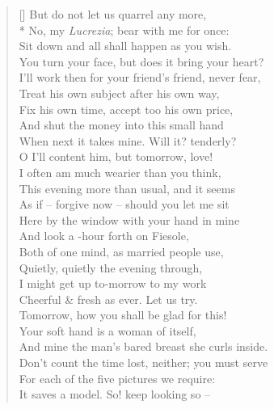 \documentclass[MAIN]{subfiles}
\begin{document}
\settowidth{\versewidth}{But do not let us quarrel any more,}
\begin{verse}[\versewidth]
But do not let us quarrel any more,\\*
No, my \emph{Lucrezia}; bear with me for once:\\ 
Sit down and all shall happen as you wish.\\
You turn your face, but does it bring your heart?\\
I'll work then for your friend's friend, never fear,\\
Treat his own subject after his own way,\\
Fix his own time, accept too his own price,\\
And shut the money into this small hand\\
When next it takes mine. Will it? tenderly?\\
O I'll content him, but tomorrow, love!\\
I often am much wearier than you think,\\
This evening more than usual, and it seems\\
As if -- forgive now -- should you let me sit\\
Here by the window with your hand in mine\\
And look a -hour forth on {\sc Fiesole},\\
Both of one mind, as married people use,\\
Quietly, quietly the evening through,\\
I might get up to-morrow to my work\\
Cheerful \& fresh as ever. Let us try.\\
Tomorrow, how you shall be glad for this!\\
Your soft hand is a woman of itself,\\
And mine the man's bared breast she curls inside.\\
Don't count the time lost, neither; you must serve\\
For each of the five pictures we require:\\
It saves a model. So! keep looking so --\\

\end{verse}
\end{document}
